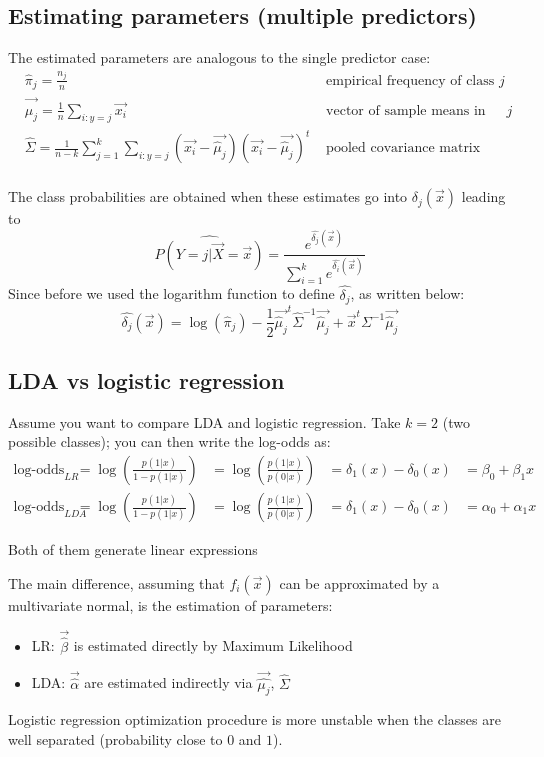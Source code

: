     \subsection{Estimating parameters (multiple predictors)}
      The estimated parameters are analogous to the single predictor case:
      \begin{align*}
      &\hat{\pi}_j = \frac{n_j}{n}
      & \text{ empirical frequency of class } j\\
      & \vec{\hat{\mu}_j}=\frac{1}{n}\sum_{i:y=j}\vec{x_i}
      & \text{ vector of sample means in class } j\\
      &\hat{\Sigma} = \frac{1}{n-k} \sum_{j=1}^{k}\sum_{i:y=j}(\vec{x_i}-\vec{\hat{\mu}_j})(\vec{x_i}-\vec{\hat{\mu}_j})^t
      & \text{ pooled covariance matrix}\\
      \end{align*}
      
      The class probabilities are obtained when these estimates go into
      $\delta_j(\vec{x})$ leading to
      $$\hat{P(Y=j|\vec{X}=\vec{x})} =
      \frac{e^{\hat{\delta_j}(\vec{x})}}{\sum_{i=1}^{k}e^{\hat{\delta_i}(\vec{x})}}$$
      Since before we used the logarithm function to define $\hat{\delta_j}$, as
      written below:
      $$\hat{\delta_j}(\vec{x}) = \log(\hat{\pi}_j) -
      \frac{1}{2}\vec{\hat{\mu}_j}^t\hat{\Sigma}^{-1}\vec{\hat{\mu}_j} +
      \vec{x}^t \Sigma^{-1}\vec{\hat{\mu}_j}$$

    \subsection{LDA vs logistic regression}
      Assume you want to compare LDA and logistic regression. Take $k=2$ (two possible classes); you
      can then write the log-odds as:
      \begin{align*}
      \text{log-odds}_{LR}
      &= \log\left(\frac{p(1|x)}{1-p(1|x)}\right)
      &= \log\left(\frac{p(1|x)}{p(0|x)}\right)
      &= \delta_1(x)-\delta_0(x)
      &= \beta_0+\beta_1x\\
      \text{log-odds}_{LDA}
      &= \log\left(\frac{p(1|x)}{1-p(1|x)}\right)
      &= \log\left(\frac{p(1|x)}{p(0|x)}\right)
      &= \delta_1(x)-\delta_0(x)
      &= \alpha_0+\alpha_1x
      \end{align*}

      Both of them generate linear expressions
      

      The main difference, assuming that $f_i(\vec{x})$ can be approximated by a
      multivariate normal, is the estimation of parameters:
      \begin{itemize}
        \item LR: $\vec{\hat{\beta}}$ is estimated directly by Maximum
        Likelihood 
        \item LDA: $\vec{\hat{\alpha}}$ are estimated indirectly via
        $\vec{\hat{\mu_j}}$, $\hat{\Sigma}$
      \end{itemize}
      Logistic regression optimization procedure is more unstable when the
      classes are well separated (probability close to $0$ and $1$).

